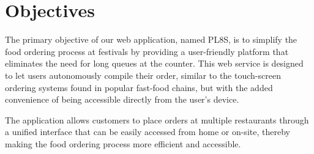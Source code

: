\section{Objectives}

The primary objective of our web application, named PL8S, is to simplify the food ordering process at festivals by providing a user-friendly platform that eliminates the need for long queues at the counter. This web service is designed to let users autonomously compile their order, similar to the touch-screen ordering systems found in popular fast-food chains, but with the added convenience of being accessible directly from the user's device.

The application allows customers to place orders at multiple restaurants through a unified interface that can be easily accessed from home or on-site, thereby making the food ordering process more efficient and accessible.

    


